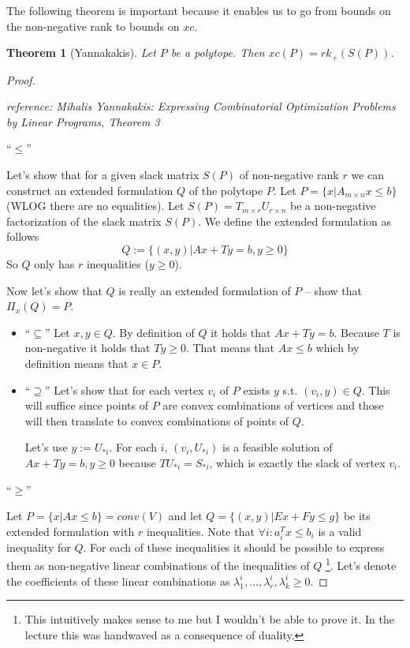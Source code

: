 \documentclass{article}
\newtheorem*{theorem}{Theorem}
\begin{document}
The following theorem is important because it enables us to go from bounds on
the non-negative rank to bounds on $xc$.

\begin{theorem}[Yannakakis]
	Let $P$ be a polytope. Then $xc(P) = rk_+(S(P))$.
\end{theorem}
\begin{proof}
	~

	\emph{reference: Mihalis Yannakakis: Expressing Combinatorial
	Optimization Problems by Linear Programs, Theorem 3}

	\noindent
	\enquote{$\le$}

	Let's show that for a given slack matrix $S(P)$ of non-negative rank
	$r$ we can construct an extended formulation $Q$ of the polytope $P$.
	Let $P = \{ x | A_{m \times n}x \le b\}$ (WLOG there are no
	equalities). Let $S(P) = T_{m \times r}U_{r \times n}$ be a
	non-negative factorization of the slack matrix $S(P)$. We define the
	extended formulation as follows
	$$
	Q := \{(x,y) | Ax + Ty = b, y \ge 0\}
	$$
	So $Q$ only has $r$ inequalities ($y \ge 0$).

	Now let's show that $Q$ is really an extended formulation of $P$ --
	show that $\Pi_x (Q) = P$.

	\begin{itemize}
		\item \enquote{$\subseteq$}
			Let $x,y \in Q$. By definition of $Q$ it holds that $Ax
			+ Ty = b$. Because $T$ is non-negative it holds that
			$Ty \ge 0$. That means that $Ax \le b$ which by
			definition means that $x \in P$.
		\item \enquote{$\supseteq$}
			Let's show that for each vertex $v_i$ of $P$ exists $y$
			s.t. $(v_i,y) \in Q$. This will suffice since points of
			$P$ are convex combinations of vertices and those
			will then translate to convex combinations of points of
			$Q$.

			Let's use $y := U_{*i}$. For each $i$, $(v_i, U_{*i})$
			is a feasible solution of $Ax + Ty = b, y \ge 0$
			because $TU_{*i} = S_{*i}$, which is exactly the slack
			of vertex $v_i$.
	\end{itemize}

	\noindent
	\enquote{$\ge$}

	Let $P = \{ x | Ax \le b \} = conv(V)$ and let $Q = \{(x,y) | Ex + Fy
	\le g\}$ be its extended formulation with $r$ inequalities. Note that
	$\forall i: a_i^Tx \le b_i$ is a valid inequality for $Q$. For each of
	these inequalities it should be possible to express them as
	non-negative linear combinations of the inequalities of $Q$
	\footnote{This intuitively makes sense to me but I wouldn't be able to
	prove it. In the lecture this was handwaved as a consequence of
	duality.}. Let's denote the coefficients of these linear combinations
	as
	$\lambda_1^i,...,\lambda_r^i, \lambda_k^i \ge 0$.


\end{proof}
\end{document}
